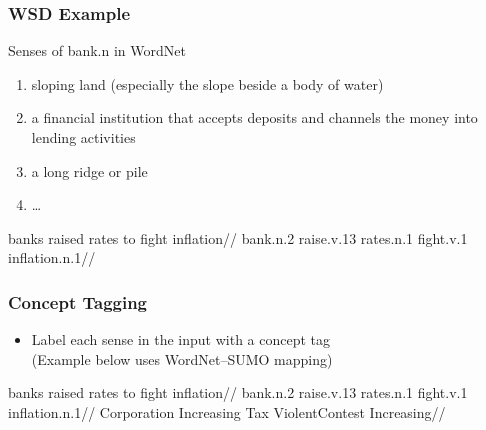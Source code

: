 \begin{frame}
\frametitle{WSD Example}

\begin{exampleblock}{Senses of bank.n in WordNet}
\begin{enumerate}
\item sloping land (especially the slope beside a body of water)
\item a financial institution that accepts deposits and channels the money into lending activities
\item a long ridge or pile
\item \ldots
\end{enumerate}
\end{exampleblock}

\ex{}
\begingl
\gla {} banks raised rates to fight inflation//
\glb {} bank.n.2 raise.v.13 rates.n.1 {} fight.v.1 inflation.n.1//
\endgl
\xe     
\end{frame}


\begin{frame}
\frametitle{Concept Tagging}
    
\begin{itemize}
\item Label each sense in the input with a concept tag \\
(Example below uses WordNet--SUMO mapping)
\end{itemize}

\ex{}
\begingl
\gla {} banks raised rates to fight inflation//
\glb {} bank.n.2 raise.v.13 rates.n.1 {} fight.v.1 inflation.n.1//
\glc {} Corporation Increasing Tax {}  ViolentContest Increasing//
\endgl
\xe 

\end{frame}


